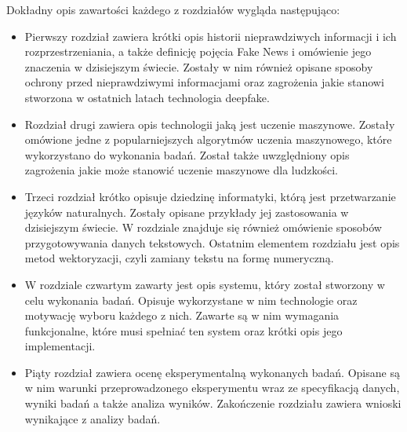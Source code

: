 Dokładny opis zawartości każdego z rozdziałów wygląda następująco:
\begin{itemize}
    \item Pierwszy rozdział zawiera krótki opis historii nieprawdziwych informacji
    i ich rozprzestrzeniania, a także definicję pojęcia Fake News i omówienie jego znaczenia 
    w dzisiejszym świecie. Zostały w nim również opisane sposoby ochrony przed nieprawdziwymi informacjami
    oraz zagrożenia jakie stanowi stworzona w ostatnich latach technologia deepfake.
    \item Rozdział drugi zawiera opis technologii jaką jest uczenie maszynowe. Zostały
    omówione jedne z popularniejszych algorytmów uczenia maszynowego, które wykorzystano
    do wykonania badań. Został także uwzględniony opis zagrożenia jakie może stanowić uczenie
    maszynowe dla ludzkości.
    \item Trzeci rozdział krótko opisuje dziedzinę informatyki, którą jest przetwarzanie 
    języków naturalnych. Zostały opisane przykłady jej zastosowania w dzisiejszym świecie.
    W rozdziale znajduje się również omówienie sposobów przygotowywania danych tekstowych. Ostatnim elementem
    rozdziału jest opis metod wektoryzacji, czyli zamiany tekstu na formę numeryczną. 
    \item W rozdziale czwartym zawarty jest opis systemu, który został 
    stworzony w celu wykonania badań. Opisuje wykorzystane w nim technologie oraz motywację 
    wyboru każdego z nich. Zawarte są w nim wymagania funkcjonalne, które musi spełniać ten system oraz
    krótki opis jego implementacji.
    \item Piąty rozdział zawiera ocenę eksperymentalną wykonanych badań. Opisane są w nim 
    warunki przeprowadzonego eksperymentu wraz ze specyfikacją danych, wyniki badań a także 
    analiza wyników. Zakończenie rozdziału zawiera wnioski wynikające z analizy badań.  
\end{itemize}